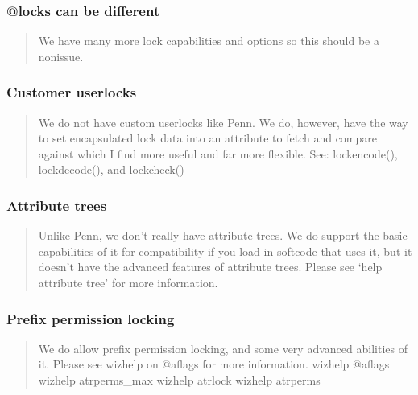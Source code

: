 \documentclass[letterpaper,10pt,english]{sphinxmanual}
\begin{document}
\subsubsection{@locks can be different}
\label{\detokenize{differences:locks-can-be-different}}\begin{quote}

\sphinxAtStartPar
We have many more lock capabilities and options
so this should be a non\sphinxhyphen{}issue.
\end{quote}


\subsubsection{Customer user\sphinxhyphen{}locks}
\label{\detokenize{differences:customer-user-locks}}\begin{quote}

\sphinxAtStartPar
We do not have custom user\sphinxhyphen{}locks like Penn.  We do, however, have the way
to set encapsulated lock data into an attribute to fetch and compare
against which I find more useful and far more flexible.
See: lockencode(), lockdecode(), and lockcheck()
\end{quote}


\subsubsection{Attribute trees}
\label{\detokenize{differences:attribute-trees}}\begin{quote}

\sphinxAtStartPar
Unlike Penn, we don’t really have attribute trees.  We do support the
basic capabilities of it for compatibility if you load in softcode that
uses it, but it doesn’t have the advanced features of attribute trees.
Please see ‘help attribute tree’ for more information.
\end{quote}


\subsubsection{Prefix permission locking}
\label{\detokenize{differences:prefix-permission-locking}}\begin{quote}

\sphinxAtStartPar
We do allow prefix permission locking, and some very advanced abilities
of it.  Please see wizhelp on @aflags for more information.
\sphinxhyphen{} wizhelp @aflags
\sphinxhyphen{} wizhelp atrperms\_max
\sphinxhyphen{} wizhelp atrlock
\sphinxhyphen{} wizhelp atrperms
\end{quote}
\end{document}
